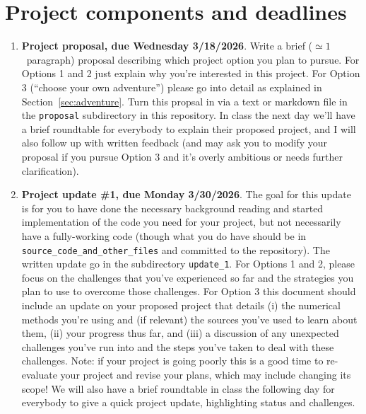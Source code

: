 \documentclass[10pt]{article}
\begin{document}
\section{Project components and deadlines}

\begin{enumerate}

\item \textbf{Project proposal, due Wednesday 3/18/2026}.  Write a
brief ($\simeq 1$~paragraph) proposal describing which project
option you plan to pursue.  For Options 1 and 2 just explain why
you're interested in this project.  For Option 3 (``choose your own
adventure'') please go into detail as explained in
Section~\ref{sec:adventure}.  Turn this propsal in via a text or
markdown file in the \texttt{proposal} subdirectory in this
repository.  In class the next day we'll have a brief roundtable for
everybody to explain their proposed project, and I will also follow up
with written feedback (and may ask you to modify your proposal if you
pursue Option 3 and it's overly ambitious or needs further
clarification).

\item \textbf{Project update \#1, due Monday 3/30/2026}.  The goal for
this update is for you to have done the necessary background reading
and started implementation of the code you need for your project, but
not necessarily have a fully-working code (though what you do have
should be in \texttt{source\_code\_and\_other\_files} and committed to
the repository).  The written update go in the subdirectory
\texttt{update\_1}.  For Options 1 and 2, please focus on the
challenges that you've experienced so far and the strategies you plan
to use to overcome those challenges.  For Option 3 this document
should include an update on your proposed project that details (i) the
numerical methods you're using and (if relevant) the sources you've
used to learn about them, (ii) your progress thus far, and (iii) a
discussion of any unexpected challenges you've run into and the steps
you've taken to deal with these challenges.  Note: if your project is
going poorly this is a good time to re-evaluate your project and
revise your plans, which may include changing its scope!  We will also
have a brief roundtable in class the following day for everybody to
give a quick project update, highlighting status and challenges.


\end{enumerate}
\end{document}
